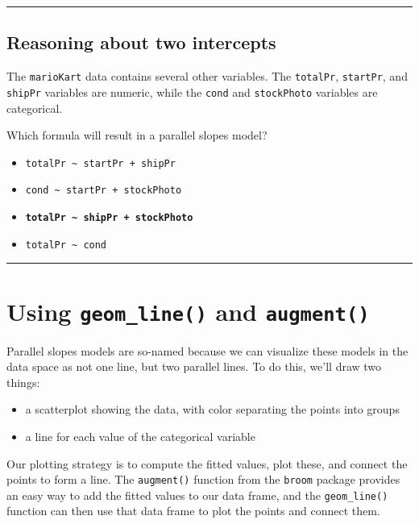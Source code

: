 \documentclass[]{book}
\begin{document}
\begin{center}\rule{0.5\linewidth}{\linethickness}\end{center}

\subsection*{Reasoning about two
intercepts}\label{reasoning-about-two-intercepts}

The \texttt{marioKart} data contains several other variables. The
\texttt{totalPr}, \texttt{startPr}, and \texttt{shipPr} variables are
numeric, while the \texttt{cond} and \texttt{stockPhoto} variables are
categorical.

Which formula will result in a parallel slopes model?

\begin{itemize}
\item
  \texttt{totalPr\ \textasciitilde{}\ startPr\ +\ shipPr}
\item
  \texttt{cond\ \textasciitilde{}\ startPr\ +\ stockPhoto}
\item
  \textbf{\texttt{totalPr\ \textasciitilde{}\ shipPr\ +\ stockPhoto}}
\item
  \texttt{totalPr\ \textasciitilde{}\ cond}
\end{itemize}

\begin{center}\rule{0.5\linewidth}{\linethickness}\end{center}

\section{\texorpdfstring{Using \texttt{geom\_line()} and
\texttt{augment()}}{Using geom\_line() and augment()}}\label{using-geom_line-and-augment}

Parallel slopes models are so-named because we can visualize these
models in the data space as not one line, but two parallel lines. To do
this, we'll draw two things:

\begin{itemize}
\item
  a scatterplot showing the data, with color separating the points into
  groups
\item
  a line for each value of the categorical variable
\end{itemize}

Our plotting strategy is to compute the fitted values, plot these, and
connect the points to form a line. The \texttt{augment()} function from
the \texttt{broom} package provides an easy way to add the fitted values
to our data frame, and the \texttt{geom\_line()} function can then use
that data frame to plot the points and connect them.
\end{document}
